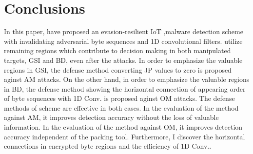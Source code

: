 \chapter{Conclusions}\label{sec:conclusion}
In this paper, \we have proposed an evasion-resilient IoT ,malware detection scheme with invalidating adversarial byte sequences and 1D convolutional filters. 
\We utilize remaining regions which contribute to decision making in both manipulated targets, GSI and BD, even after the attacks.
In order to emphasize the valuable regions in GSI, the defense method converting JP values to zero is proposed aginst AM attacks.
On the other hand, in order to emphasize the valuable regions in BD, the defense method showing the horizontal connection of appearing order of byte sequences with 1D Conv. is proposed aginst OM attacks.
The defense methods of \our scheme are effective in both cases.
In the evaluation of the method against AM, it improves detection accuracy without the loss of valuable information.
In the evaluation of the method against OM, it improves detection accuracy independent of the packing tool.
Furthermore, I discover the horizontal connections in encrypted byte regions and the efficiency of 1D Conv..

